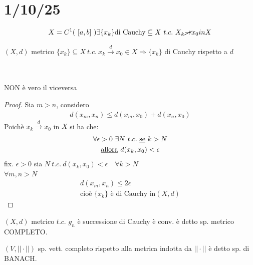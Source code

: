 \documentclass[a4paper, oneside]{article}
\begin{document}
    \section{1/10/25}
    \begin{example}
        \begin{gather*}
            X = C^1 ( \ [a,b] \ ) \exists \{x_k\} \text{di Cauchy} \subseteq X \ t.c. \ X_k \cancel{ \to } x_0 in X        
        \end{gather*}
    \end{example}
    \begin{theorem}
        $(X,d)$ metrico $\{x_k\} \subseteq X \ t.c. \ x_k \xrightarrow{d} x_0 \in X \Rightarrow \{x_k\}$  di Cauchy rispetto a $d$
    \end{theorem}
    \hfil\\
    \\
    NON è vero il viceversa\\
    \begin{proof}
        Sia $m>n$, considero\\
        \begin{gather*}
            d(x_m,x_n) \leq d(x_m,x_0) + d(x_n,x_0)
        \end{gather*}
        Poichè $x_k \xrightarrow{d} x_0$ in $ X$ si ha che:
        \begin{gather*}
            \forall \epsilon > 0 \ \exists N \ t.c. \ \text{\underbar{se} } k > N\\
            \text{\underbar{allora} } d(x_k,x_0) < \epsilon 
        \end{gather*}
        fix. $\epsilon > 0$ sia $N \ t.c. \ d(x_k,x_0) < \epsilon \quad \forall k>N$\\
         $\forall m,n > N$\\
        \begin{gather*}
            d(x_m,x_n) \leq 2\epsilon\\
            \text{cioè } \{x_k\} \text{ è di Cauchy in} (X,d) 
        \end{gather*}
    \end{proof}


    \begin{definition}
        $(X,d)$ metrico $t.c.$ $g_n$ è successione di Cauchy è conv. è detto sp. metrico COMPLETO.
    \end{definition}

    \begin{definition}
        $(V, ||\cdot||)$ sp. vett. completo rispetto alla metrica indotta da $||\cdot||$ è detto sp. di BANACH.
    \end{definition}
\end{document}
